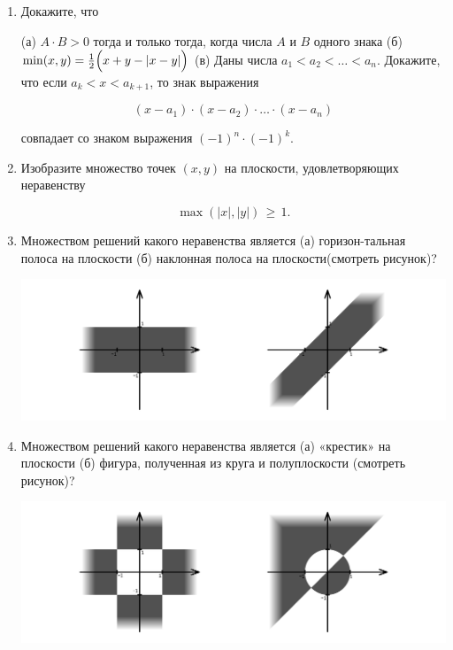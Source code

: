 \begin{enumerate}
\item Докажите, что

\subitem (а) $A \cdot B > 0$ тогда и только тогда, когда числа $A$ и $B$ одного знака\scolon
\subitem (б) $\min (x,y) = \frac{1}{2} \Bigl( x + y - |x - y| \Bigr)$\scolon
\subitem (в) Даны числа $a_1 < a_2 < \ldots < a_n$. Докажите, что если $a_k < x < a_{k+1}$, то знак выражения

\vspace{-0.3cm}
$$(x-a_1)\cdot (x-a_2)\cdot \ldots \cdot (x-a_n)$$

\vspace{-0.15cm}
совпадает со знаком выражения $(-1)^n \cdot (-1)^k$.

\item Изобразите множество точек $(x,y)$ на плоскости, удовлетворяющих неравенству

\vspace{-0.3cm}
$$\max(|x|, |y|)\,\geq\,1.$$

\item Множеством решений какого неравенства является (а) горизон-\linebreak тальная полоса на плоскости (б) наклонная полоса на плоскости\linebreak (смотреть рисунок)?

\centerline{\includegraphics[width=13.75cm]{stats/2018/graph/1}}

\item Множеством решений какого неравенства является (а) «крестик» на плоскости (б) фигура, полученная из круга и полуплоскости (смотреть рисунок)?

\centerline{\includegraphics[width=13.75cm]{stats/2018/graph/2}}


\end{enumerate}
